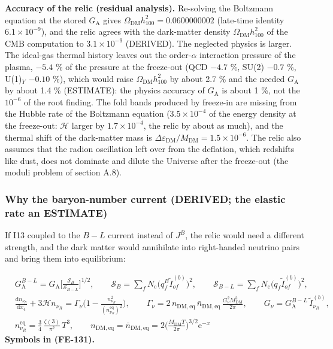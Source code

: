 \documentclass[
  10pt,
]{article}
\begin{document}
\textbf{Accuracy of the relic (residual analysis).} Re-solving the
Boltzmann equation at the stored \(G_{\mathrm{A}}\) gives
\(\Omega_{\mathrm{DM}}h_{100}^2 = 0.0600000002\) (late-time identity
\(6.1\times10^{-9}\)), and the relic agrees with the dark-matter density
\(\Omega_{\mathrm{DM}}h_{100}^2\) of the CMB computation to
\(3.1\times10^{-9}\) (DERIVED). The neglected physics is larger. The
ideal-gas thermal history leaves out the order-\(\alpha\) interaction
pressure of the plasma, \(-5.4\) \% of the pressure at the freeze-out
(QCD \(-4.7\) \%, SU(2) \(-0.7\) \%, U(1)\(_Y\) \(-0.10\) \%), which
would raise \(\Omega_{\mathrm{DM}}h_{100}^2\) by about 2.7 \% and the
needed \(G_{\mathrm{A}}\) by about 1.4 \% (ESTIMATE): the physics
accuracy of \(G_{\mathrm{A}}\) is about 1 \%, not the \(10^{-6}\) of the
root finding. The fold bands produced by freeze-in are missing from the
Hubble rate of the Boltzmann equation (\(3.5\times10^{-4}\) of the
energy density at the freeze-out: \(\mathcal{H}\) larger by
\(1.7\times10^{-4}\), the relic by about as much), and the thermal shift
of the dark-matter mass is
\(\Delta\varepsilon_{\mathrm{DM}}/M_{\mathrm{DM}} = 1.5\times10^{-6}\).
The relic also assumes that the radion oscillation left over from the
deflation, which redshifts like dust, does not dominate and dilute the
Universe after the freeze-out (the moduli problem of section A.8).

\hypertarget{why-the-baryon-number-current-derived-the-elastic-rate-an-estimate}{%
\subsubsection*{Why the baryon-number current (DERIVED; the elastic rate
an
ESTIMATE)}\label{why-the-baryon-number-current-derived-the-elastic-rate-an-estimate}}

If I13 coupled to the \(B - L\) current instead of \(J^B\), the relic
would need a different strength, and the dark matter would annihilate
into right-handed neutrino pairs and bring them into equilibrium:

\[
\begin{aligned}
&G_{\mathrm{A}}^{B-L} = G_{\mathrm{A}}\Big[\frac{\mathcal{S}_B}{\mathcal{S}_{B-L}}\Big]^{1/2},\qquad
 \mathcal{S}_B = \sum_fN_{\mathrm{c}}\big(q^{B}_f\tilde I^{(b)}_{of}\big)^2,\qquad
 \mathcal{S}_{B-L} = \sum_fN_{\mathrm{c}}\big(q_f\tilde I^{(b)}_{of}\big)^2,\\
&\frac{\mathrm{d}n_{\nu_R}}{\mathrm{d}x_4} + 3\mathcal{H}n_{\nu_R} = \Gamma_\nu\Big(1 -
 \frac{n_{\nu_R}^2}{(n_{\nu_R}^{\mathrm{eq}})^2}\Big),\qquad
 \Gamma_\nu = 2\,n_{\mathrm{DM,eq}}\,\bar n_{\mathrm{DM,eq}}\,\frac{G_\nu^2M_{\mathrm{DM}}^2}{2\pi},\qquad
 G_\nu = G_{\mathrm{A}}^{B-L}\,\tilde I^{(b)}_{\nu_R},\\
&n_{\nu_R}^{\mathrm{eq}} = \frac34\,\frac{\zeta(3)}{\pi^2}\,T^3,\qquad
 n_{\mathrm{DM,eq}} = \bar n_{\mathrm{DM,eq}} = 2\Big(\frac{M_{\mathrm{DM}}T}{2\pi}\Big)^{3/2}\mathrm{e}^{-x}
\end{aligned} \tag{FE-131}
\] \textbf{Symbols in (FE-131).}
\end{document}
